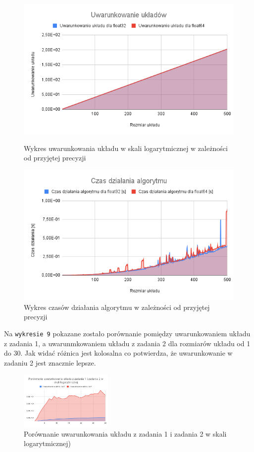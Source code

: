 \documentclass{article}
\begin{document}
\begin{figure}[H]
  \begin{minipage}[b]{0.49\textwidth}
    \includegraphics[width=\textwidth]{img07.png}
    \caption{Wykres uwarunkowania układu w skali logarytmicznej w zależności od przyjętej precyzji}
  \end{minipage}
  \hfill
  \begin{minipage}[b]{0.49\textwidth}
    \includegraphics[width=\textwidth]{img08.png}
    \caption{Wykres czasów działania algorytmu w zależności od przyjętej precyzji}
  \end{minipage}
\end{figure}

\noindent
Na \texttt{wykresie 9} pokazane zostało porównanie pomiędzy uwarunkowaniem układu z zadania 1, a uwarunmkowaniem układu z zadania 2 dla rozmiarów układu od 1 do 30. Jak widać różnica jest kolosalna co potwierdza, że uwarunkowanie w zadaniu 2 jest znacznie lepsze.

\begin{figure}[H]
  \centering
    \includegraphics[width=0.4\textwidth]{img09.png}
  \caption{Porównanie uwarunkowania układu z zadania 1 i zadania 2 w skali logarytmicznej)}
\end{figure}
\end{document}
